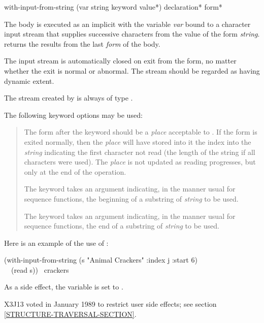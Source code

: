 \begin{defmac}
with-input-from-string (var string {keyword value}*)
      {declaration}* {form}*

The body is executed as an implicit  with the variable \emph{var}
bound to a character input stream that supplies successive characters from
the value of the form \emph{string}.  
returns the results from the last \emph{form} of the body.

The input stream is automatically closed on exit from
the  form,
no matter whether the exit is normal or abnormal.
The stream should be regarded as having dynamic extent.

The stream created by
 is always of type .

The following keyword options may be used:
\begin{quotation}
\begin{flushdesc}
\item[\cd{:index}]
The form after the  keyword should be a \emph{place}
acceptable to .  If the  form
is exited normally, then the \emph{place} will have stored into it the
index into the \emph{string} indicating the first character not read
(the length of the string if all characters were used).
The \emph{place} is not updated as reading progresses, but only at the
end of the operation. 

\item[\cd{:start}]
The  keyword takes an argument indicating, in the manner
usual for sequence functions, the beginning of
a substring of \emph{string} to be used.

\item[\cd{:end}]
The  keyword takes an argument indicating, in the manner
usual for sequence functions, the end of
a substring of \emph{string} to be used.
\end{flushdesc}
\end{quotation}

Here is an example of the use of :
\begin{lisp}
(with-input-from-string (s "Animal Crackers" :index j :start 6) \\
~~(read s)) \EV\ crackers
\end{lisp}
As a side effect, the variable  is set to .

\begin{new}
X3J13 voted in January 1989
to restrict user side effects; see section \ref{STRUCTURE-TRAVERSAL-SECTION}.
\end{new}
\end{defmac}

